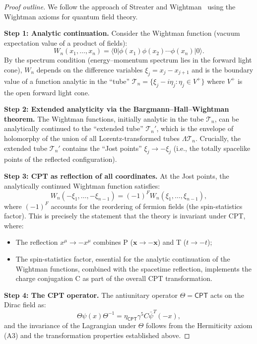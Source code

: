 \documentclass[12pt]{article}
\theoremstyle{definition}
\theoremstyle{remark}
\newcommand{\CPT}{\mathsf{CPT}}
\newcommand{\psibar}{\bar{\psi}}
\newcommand{\bra}[1]{\langle #1 |}
\newcommand{\ket}[1]{| #1 \rangle}
\begin{document}
\begin{proof}[Proof outline]
We follow the approach of Streater and Wightman~\cite{StreaterWightman} using the
Wightman axioms for quantum field theory.

\textbf{Step 1: Analytic continuation.}
Consider the Wightman function (vacuum expectation value of a product of fields):
\begin{equation}
W_n(x_1, \ldots, x_n) = \bra{0} \phi(x_1) \phi(x_2) \cdots \phi(x_n) \ket{0}.
\end{equation}
By the spectrum condition (energy--momentum spectrum lies in the forward light cone),
$W_n$ depends on the difference variables $\xi_j = x_j - x_{j+1}$ and is the boundary
value of a function analytic in the ``tube'' $\mathcal{T}_n = \{\xi_j - i\eta_j : \eta_j \in V^+\}$
where $V^+$ is the open forward light cone.

\textbf{Step 2: Extended analyticity via the Bargmann--Hall--Wightman theorem.}
The Wightman functions, initially analytic in the tube $\mathcal{T}_n$, can be
analytically continued to the ``extended tube'' $\mathcal{T}_n'$, which is the
envelope of holomorphy of the union of all Lorentz-transformed tubes
$\Lambda \mathcal{T}_n$. Crucially, the extended tube $\mathcal{T}_n'$ contains the
``Jost points'' $\xi_j \to -\xi_j$ (i.e., the totally spacelike points of the
reflected configuration).

\textbf{Step 3: CPT as reflection of all coordinates.}
At the Jost points, the analytically continued Wightman function satisfies:
\begin{equation}
\label{eq:cpt_wightman}
W_n(-\xi_1, \ldots, -\xi_{n-1}) = (-1)^F W_n(\xi_1, \ldots, \xi_{n-1}),
\end{equation}
where $(-1)^F$ accounts for the reordering of fermion fields (the spin-statistics
factor). This is precisely the statement that the theory is invariant under CPT,
where:
\begin{itemize}
    \item The reflection $x^\mu \to -x^\mu$ combines P ($\mathbf{x} \to -\mathbf{x}$)
    and T ($t \to -t$);
    \item The spin-statistics factor, essential for the analytic continuation of the
    Wightman functions, combined with the spacetime reflection, implements the charge
    conjugation C as part of the overall CPT transformation.
\end{itemize}

\textbf{Step 4: The CPT operator.}
The antiunitary operator $\Theta = \CPT$ acts on the Dirac field as:
\begin{equation}
\Theta \psi(x) \Theta^{-1} = \eta_{\CPT} \gamma^5 C \psibar^T(-x),
\end{equation}
and the invariance of the Lagrangian under $\Theta$ follows from the Hermiticity
axiom (A3) and the transformation properties established above.
\end{proof}
\end{document}
